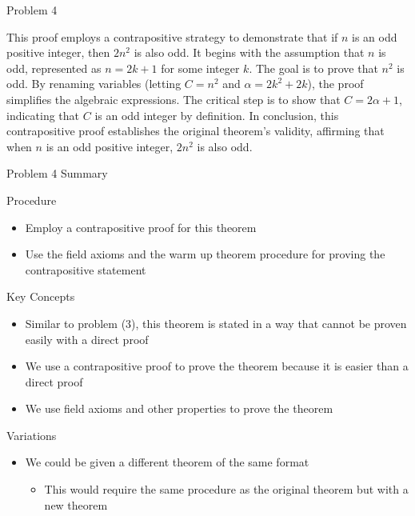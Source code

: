 \begin{problem}{Problem 4}
\begin{Highlight}[Solution]
        \vspace*{1em}

        This proof employs a contrapositive strategy to demonstrate that if $n$ is an odd positive integer, then $2n^2$ is also odd. It begins with the assumption that $n$ is odd, represented as 
        $n = 2k + 1$ for some integer $k$. The goal is to prove that $n^2$ is odd. By renaming variables (letting $C = n^2$ and $\alpha = 2k^2 + 2k$), the proof simplifies the algebraic expressions. 
        The critical step is to show that $C = 2\alpha + 1$, indicating that $C$ is an odd integer by definition. In conclusion, this contrapositive proof establishes the original theorem's validity, 
        affirming that when $n$ is an odd positive integer, $2n^2$ is also odd.
    \end{Highlight}
\end{problem}

\begin{summary}{Problem 4 Summary}
    \begin{statement}{Procedure}
        \begin{itemize}
            \item Employ a contrapositive proof for this theorem
            \item Use the field axioms and the warm up theorem procedure for proving the contrapositive statement
        \end{itemize}
    \end{statement}
    \begin{statement}{Key Concepts}
        \begin{itemize}
            \item Similar to problem (3), this theorem is stated in a way that cannot be proven easily with a direct proof
            \item We use a contrapositive proof to prove the theorem because it is easier than a direct proof
            \item We use field axioms and other properties to prove the theorem
        \end{itemize}
    \end{statement}
    \begin{statement}{Variations}
        \begin{itemize}
            \item We could be given a different theorem of the same format
            \begin{itemize}
                \item This would require the same procedure as the original theorem but with a new theorem
            \end{itemize}
        \end{itemize}
    \end{statement}
\end{summary}

